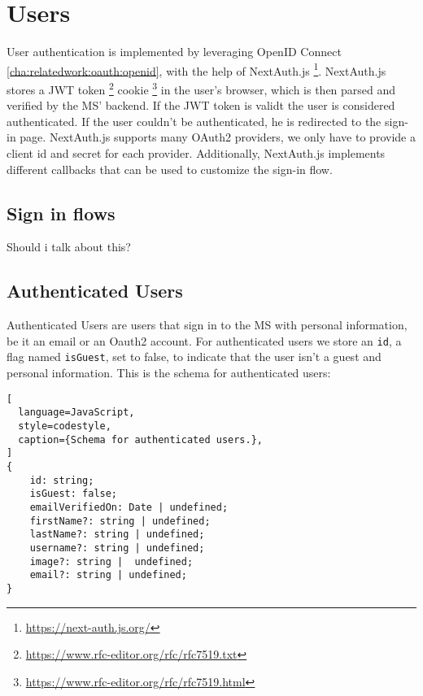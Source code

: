 
\section{Users}

User authentication is implemented by leveraging OpenID Connect
\ref{cha:relatedwork:oauth:openid}, with the help of NextAuth.js \footnote{\url{https://next-auth.js.org/}}.
NextAuth.js stores a JWT token \footnote{\url{https://www.rfc-editor.org/rfc/rfc7519.txt}}
cookie \footnote{\url{https://www.rfc-editor.org/rfc/rfc7519.html}} in the user's browser,
which is then parsed and verified by the MS' backend.
If the JWT token is validt the user is considered authenticated.
If the user couldn't be authenticated, he is redirected to the sign-in page.
NextAuth.js supports many OAuth2 providers, we only have to provide a client id and secret for each provider.
Additionally, NextAuth.js implements different callbacks that can be used to customize the sign-in flow.

%

\subsection{Sign in flows}

Should i talk about this?

\subsection{Authenticated Users}

Authenticated Users are users that sign in to the MS with personal information, be
it an email or an Oauth2 account.
For authenticated users we store an \lstinline{id}, a flag named \lstinline{isGuest}, set
to false, to indicate that the user isn't a guest and personal information.
This is the schema for authenticated users:

\begin{lstlisting}[
  language=JavaScript,
  style=codestyle,
  caption={Schema for authenticated users.},
]
{
    id: string;
    isGuest: false;
    emailVerifiedOn: Date | undefined;
    firstName?: string | undefined;
    lastName?: string | undefined;
    username?: string | undefined;
    image?: string |  undefined;
    email?: string | undefined;
}
\end{lstlisting}

